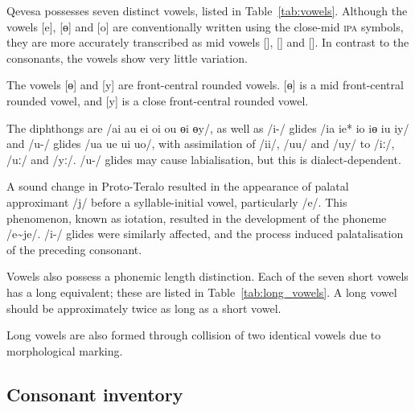 \documentclass[grammar]{subfiles}
\begin{document}
  Qevesa possesses seven distinct vowels, listed in Table~\ref{tab:vowels}.  Although the vowels [e], [ɵ] and [o] are conventionally written using the close-mid \textsc{ipa} symbols, they are more accurately transcribed as mid vowels [], [] and [].  In contrast to the consonants, the vowels show very little variation.

  The vowels [ɵ] and [y] are front-central rounded vowels.  [ɵ] is a mid front-central rounded vowel, and [y] is a close front-central rounded vowel.

  The diphthongs are /ai au ei oi ou ɵi ɵy/, as well as /i-/ glides /ia ie* io iɵ iu iy/ and /u-/ glides /ua ue ui uo/, with assimilation of /ii/, /uu/ and /uy/ to /iː/, /uː/ and /yː/.  /u-/ glides may cause labialisation, but this is dialect-dependent.  

  A sound change in Proto-Teralo resulted in the appearance of palatal approximant /j/ before a syllable-initial vowel, particularly /e/.  This phenomenon, known as iotation, resulted in the development of the phoneme /\superj e\textasciitilde je/.  /i-/ glides were similarly affected, and the process induced palatalisation of the preceding consonant.

  Vowels also possess a phonemic length distinction.  Each of the seven short vowels has a long equivalent; these are listed in Table~\ref{tab:long_vowels}.  A long vowel should be approximately twice as long as a short vowel.

  Long vowels are also formed through collision of two identical vowels due to morphological marking.

  \subsection{Consonant inventory}
  \label{ssec:consonants}
\end{document}
